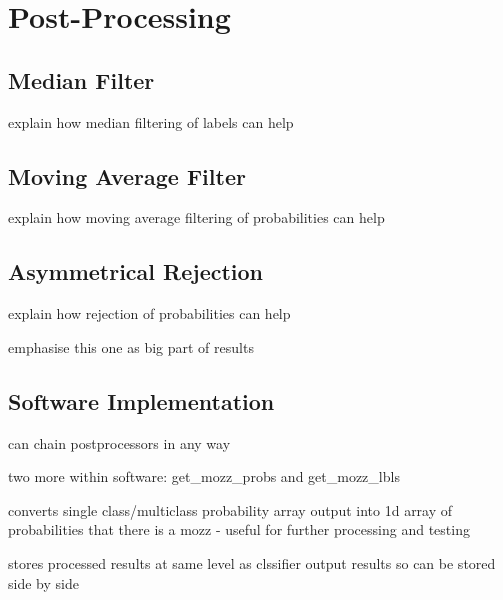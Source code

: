\section{Post-Processing}
\label{sec:pl-postproc}

    \subsection{Median Filter}
    \label{subsec:pl-postproc-med}
        \begin{sitemize}
            \item{explain how median filtering of labels can help}
        \end{sitemize}
        
    \subsection{Moving Average Filter}
    \label{subsec:pl-postproc-avg}
        \begin{sitemize}
            \item{explain how moving average filtering of probabilities can help}
        \end{sitemize}
        
    \subsection{Asymmetrical Rejection}
    \label{subsec:pl-postproc-rej}
        \begin{sitemize}
            \item{explain how rejection of probabilities can help}
            \item{emphasise this one as big part of results}
        \end{sitemize}
        
    \subsection{Software Implementation}
    \label{subsec:pl-postproc-software}
        \begin{sitemize}
            \item{can chain postprocessors in any way}
            \item{two more within software: get\_mozz\_probs and get\_mozz\_lbls}
            \item{converts single class/multiclass probability array output into 1d array of probabilities that there is a mozz - useful for further processing and testing}
            \item{stores processed results at same level as clssifier output results so can be stored side by side}
        \end{sitemize} 

